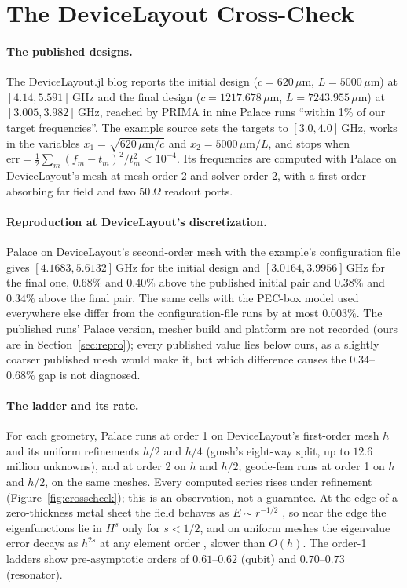 \documentclass{anvil-paper}
\begin{document}
\section{The DeviceLayout Cross-Check}
\label{sec:crosscheck}

\paragraph{The published designs.}
The DeviceLayout.jl blog \citep{devicelayout-blog} reports the initial
design ($c = 620\,\mu$m, $L = 5000\,\mu$m) at $[4.14, 5.591]$\,GHz and
the final design ($c = 1217.678\,\mu$m, $L = 7243.955\,\mu$m) at
$[3.005, 3.982]$\,GHz, reached by PRIMA in nine Palace runs ``within 1\% of
our target frequencies''. The example source \citep{devicelayout-example}
sets the targets to $[3.0, 4.0]$\,GHz, works in the variables $x_1 =
\sqrt{620\,\mu\mathrm{m}/c}$ and $x_2 = 5000\,\mu\mathrm{m}/L$, and stops
when $\mathrm{err} = \frac12\sum_m (f_m - t_m)^2/t_m^2 < 10^{-4}$. Its
frequencies are computed with Palace on DeviceLayout's mesh at mesh order 2
and solver order 2, with a first-order absorbing far field and two
$50\,\Omega$ readout ports.

\paragraph{Reproduction at DeviceLayout's discretization.}
Palace on DeviceLayout's second-order mesh with the example's
configuration file gives $[4.1683, 5.6132]$\,GHz for the initial design
and $[3.0164, 3.9956]$\,GHz for the final one, $0.68\%$ and $0.40\%$
above the published initial pair and $0.38\%$ and $0.34\%$ above the
final pair. The same cells with the PEC-box model used everywhere else
differ from the configuration-file runs by at most $0.003\%$. The
published runs' Palace version, mesher build and platform are not
recorded (ours are in Section~\ref{sec:repro}); every published value lies
below ours, as a slightly coarser published mesh would make it, but which
difference causes the $0.34$--$0.68\%$ gap is not diagnosed.

\paragraph{The ladder and its rate.}
For each geometry, Palace runs at order 1 on DeviceLayout's first-order
mesh $h$ and its uniform refinements $h/2$ and $h/4$ (gmsh's eight-way
split, up to $12.6$ million unknowns), and at order 2 on $h$ and $h/2$;
geode-fem runs at order 1 on $h$ and $h/2$, on the same meshes. Every
computed series rises under refinement (Figure~\ref{fig:crosscheck}); this
is an observation, not a guarantee. At the edge of a zero-thickness metal
sheet the field behaves as $E \sim r^{-1/2}$ \citep{meixner1972behavior},
so near the edge the eigenfunctions lie in $H^{s}$ only for $s < 1/2$, and
on uniform meshes the eigenvalue error decays as $h^{2s}$ at any element
order \citep{boffi2010finite}, slower than $O(h)$. The order-1
ladders show pre-asymptotic orders of $0.61$--$0.62$ (qubit) and $0.70$--$0.73$
(resonator).
\end{document}
